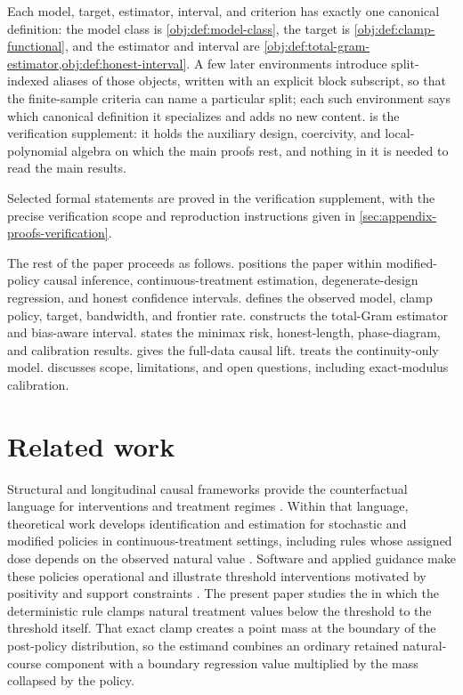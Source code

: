 \documentclass[11pt]{article}
\begin{document}
Each model, target, estimator, interval, and criterion has exactly one canonical definition: the model class is \cref{obj:def:model-class}, the target is \cref{obj:def:clamp-functional}, and the estimator and interval are \cref{obj:def:total-gram-estimator,obj:def:honest-interval}. A few later environments introduce split-indexed aliases of those objects, written with an explicit block subscript, so that the finite-sample criteria can name a particular split; each such environment says which canonical definition it specializes and adds no new content.  is the verification supplement: it holds the auxiliary design, coercivity, and local-polynomial algebra on which the main proofs rest, and nothing in it is needed to read the main results.

Selected formal statements are proved in the verification supplement, with the precise verification scope and reproduction instructions given in \cref{sec:appendix-proofs-verification}.

The rest of the paper proceeds as follows.  positions the paper within modified-policy causal inference, continuous-treatment estimation, degenerate-design regression, and honest confidence intervals.  defines the observed model, clamp policy, target, bandwidth, and frontier rate.  constructs the total-Gram estimator and bias-aware interval.  states the minimax risk, honest-length, phase-diagram, and calibration results.  gives the full-data causal lift.  treats the continuity-only model.  discusses scope, limitations, and open questions, including exact-modulus calibration.


\section{Related work}
\label{sec:related-work}

Structural and longitudinal causal frameworks provide the counterfactual language for interventions and treatment regimes \citep{Pearl2009,Robins2000,vanderLaan2003,vanderLaan2011}. Within that language, theoretical work develops identification and estimation for stochastic and modified policies in continuous-treatment settings, including rules whose assigned dose depends on the observed natural value \citep{Diaz2012,Haneuse2013,Young2014,DiazWilliamsHoffmanSchenck2023}. Software and applied guidance make these policies operational and illustrate threshold interventions motivated by positivity and support constraints \citep{WilliamsDiaz2023lmtp,HoffmanSalazarBarretoWilliamsRudolphDiaz2024}. The present paper studies the  in which the deterministic rule clamps natural treatment values below the threshold to the threshold itself. That exact clamp creates a point mass at the boundary of the post-policy distribution, so the estimand combines an ordinary retained natural-course component with a boundary regression value multiplied by the mass collapsed by the policy.
\end{document}
